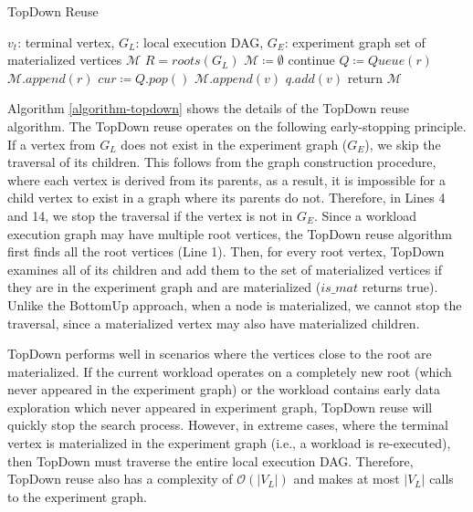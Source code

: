 \begin{algorithm}[h]
\caption{TopDown Reuse}\label{algorithm-topdown}
\begin{algorithmic}[1]
\Require $v_t$: terminal vertex, $G_L$: local execution DAG, $G_E$: experiment graph 
\Ensure set of materialized vertices $\mathcal{M}$ 
\State $R=roots(G_L)$
\State $\mathcal{M} \coloneqq \emptyset$
		\State continue 
	\EndIf
	\State $Q \coloneqq  Queue(r)$  
		 \State	 $\mathcal{M}.append(r)$
	\EndIf
			\State $cur \coloneqq  Q.pop()$
					\State	$\mathcal{M}.append(v)$
				\EndIf
					\State $q.add(v)$
				\EndIf
			\EndFor
		\EndWhile
\EndFor
\State return $\mathcal{M}$
\end{algorithmic}
\end{algorithm}
Algorithm \ref{algorithm-topdown} shows the details of the TopDown reuse algorithm.
The TopDown reuse operates on the following early-stopping principle.
If a vertex from $G_L$ does not exist in the experiment graph ($G_E$), we skip the traversal of its children.
This follows from the graph construction procedure, where each vertex is derived from its parents, as a result, it is impossible for a child vertex to exist in a graph where its parents do not.
Therefore, in Lines 4 and 14, we stop the traversal if the vertex is not in $G_E$.
Since a workload execution graph may have multiple root vertices, the TopDown reuse algorithm first finds all the root vertices (Line 1).
Then, for every root vertex, TopDown examines all of its children and add them to the set of materialized vertices if they are in the experiment graph and are materialized ($is\_mat$ returns true).
Unlike the BottomUp approach, when a node is materialized, we cannot stop the traversal, since a materialized vertex may also have materialized children.

TopDown performs well in scenarios where the vertices close to the root are materialized.
If the current workload operates on a completely new root (which never appeared in the experiment graph) or the workload contains early data exploration which never appeared in experiment graph, TopDown reuse will quickly stop the search process.
However, in extreme cases, where the terminal vertex is materialized in the experiment graph (i.e., a workload is re-executed), then TopDown must traverse the entire local execution DAG.
Therefore, TopDown reuse also has a complexity of $\mathcal{O}(|V_L|)$ and makes at most $|V_L|$ calls to the experiment graph.

